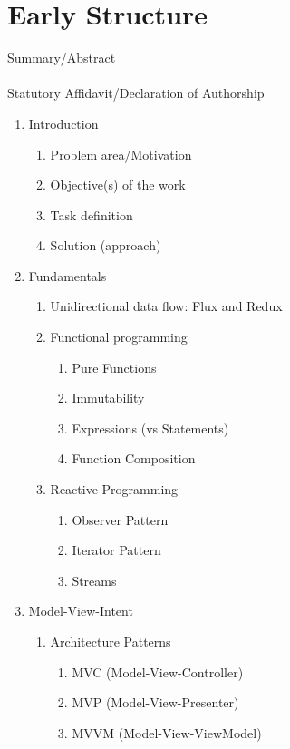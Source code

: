 \section{Early Structure}
\label{sec:early-structure}

\hspace*{1em} 
Summary/Abstract
\\
\\
\hspace*{1em}
Statutory Affidavit/Declaration of Authorship

\begin{enumerate}
	\item Introduction
	\begin{enumerate}
		\item Problem area/Motivation
		\item Objective(s) of the work
		\item Task definition
		\item Solution (approach)
	\end{enumerate}
	\item Fundamentals
	\begin{enumerate}
		\item Unidirectional data flow: Flux and Redux
		\item Functional programming
		\begin{enumerate}
			\item Pure Functions
			\item Immutability
			\item Expressions (vs Statements)
			\item Function Composition
		\end{enumerate}
		\item Reactive Programming
		\begin{enumerate}
			\item Observer Pattern
			\item Iterator Pattern
			\item Streams
		\end{enumerate}
	\end{enumerate}
	\item Model-View-Intent
		\begin{enumerate}
			\item Architecture Patterns
			\begin{enumerate}
				\item MVC (Model-View-Controller)
				\item MVP (Model-View-Presenter)
				\item MVVM (Model-View-ViewModel)

\end{enumerate}
\end{enumerate}
\end{enumerate}
